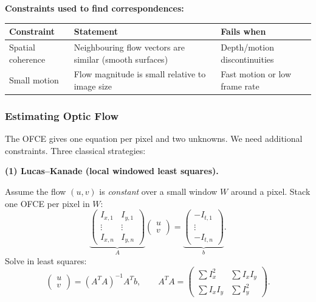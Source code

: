\textbf{Constraints used to find correspondences:}

\begin{center}
\renewcommand{\arraystretch}{1.3}
\begin{tabular}{@{} l p{6.5cm} p{4cm} @{}}
\toprule
\textbf{Constraint} & \textbf{Statement} & \textbf{Fails when} \\
\midrule
Spatial coherence & Neighbouring flow vectors are similar (smooth surfaces) & Depth/motion discontinuities \\
Small motion & Flow magnitude is small relative to image size & Fast motion or low frame rate \\
\bottomrule
\end{tabular}
\end{center}

\bigseparator

\subsubsection{Estimating Optic Flow}

The OFCE gives one equation per pixel and two unknowns. We need additional constraints. Three classical strategies:

\textbf{(1) Lucas--Kanade (local windowed least squares).}

\begin{thmbox}
Assume the flow $(u,v)$ is \emph{constant} over a small window $W$ around a pixel. Stack one OFCE per pixel in $W$:
\[
\underbrace{\begin{pmatrix} I_{x,1} & I_{y,1} \\ \vdots & \vdots \\ I_{x,n} & I_{y,n} \end{pmatrix}}_{A} \begin{pmatrix} u \\ v \end{pmatrix} = \underbrace{\begin{pmatrix} -I_{t,1} \\ \vdots \\ -I_{t,n} \end{pmatrix}}_{b}.
\]
Solve in least squares:
\[
\begin{pmatrix} u \\ v \end{pmatrix} = (A^T A)^{-1} A^T b, \qquad A^T A = \begin{pmatrix} \sum I_x^2 & \sum I_x I_y \\ \sum I_x I_y & \sum I_y^2 \end{pmatrix}.
\]
\end{thmbox}


